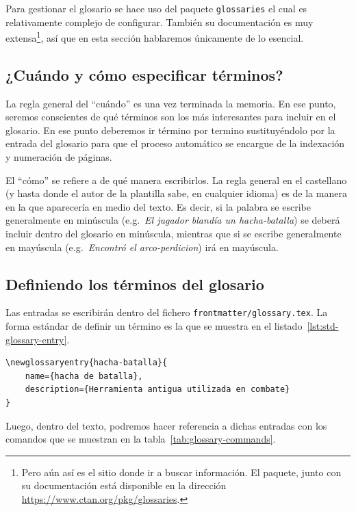 Para gestionar el glosario se hace uso del paquete \texttt{glossaries} el cual es relativamente complejo de configurar. También su documentación es muy extensa\footnote{Pero aún así es el sitio donde ir a buscar información. El paquete, junto con su documentación está disponible en la dirección \href{https://www.ctan.org/pkg/glossaries}{https://www.ctan.org/pkg/glossaries}.}, así que en esta sección hablaremos únicamente de lo esencial.

\subsection{¿Cuándo y cómo especificar términos?}

La regla general del \enquote{cuándo} es una vez terminada la memoria. En ese punto, seremos conscientes de qué términos son los más interesantes para incluir en el glosario. En ese punto deberemos ir término por termino sustituyéndolo por la entrada del glosario para que el proceso automático se encargue de la indexación y numeración de páginas.

El \enquote{cómo} se refiere a de qué manera escribirlos. La regla general en el castellano (y hasta donde el autor de la plantilla sabe, en cualquier idioma) es de la manera en la que aparecería en medio del texto. Es decir, si la palabra se escribe generalmente en minúscula (e.g.~\textit{El jugador blandía un \gls{hacha-batalla}}) se deberá incluir dentro del glosario en minúscula, mientras que si se escribe generalmente en mayúscula (e.g.~\textit{Encontró el \gls{arco-perdicion}}) irá en mayúscula.

\subsection{Definiendo los términos del glosario}

Las entradas se escribirán dentro del fichero \texttt{frontmatter/glossary.tex}. La forma estándar de definir un término es la que se muestra en el listado~\ref{lst:std-glossary-entry}.

\begin{lstlisting}[language={[latex]TeX},caption=Código para crear una entrada en el glosario,label=lst:std-glossary-entry]
\newglossaryentry{hacha-batalla}{
    name={hacha de batalla},
    description={Herramienta antigua utilizada en combate}
}
\end{lstlisting}

Luego, dentro del texto, podremos hacer referencia a dichas entradas con los comandos que se muestran en la tabla~\ref{tab:glossary-commands}.

